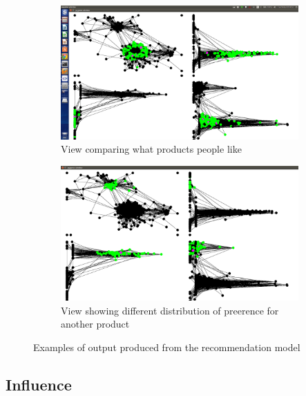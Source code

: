\documentclass[12pt,a4paper]{article}
\begin{document}
\begin{figure}
	\begin{subfigure}[b]{0.4\linewidth}
	\caption{View comparing what products people like}
	\label{fig:RecommendationComparison}
	\includegraphics[scale=0.1]{Recommendation3.png}
	\end{subfigure}
\quad
	\begin{subfigure}[b]{0.4\linewidth}
	\caption{View showing different distribution of preerence for another product}
	\label{fig:RecommendationDifferent}
	\includegraphics[scale=0.1]{Recommendation4.png}
	\end{subfigure}
\caption{Examples of output produced from the recommendation model}
\label{fig:recommendation}
\end{figure}

\subsection{Influence}
\end{document}
